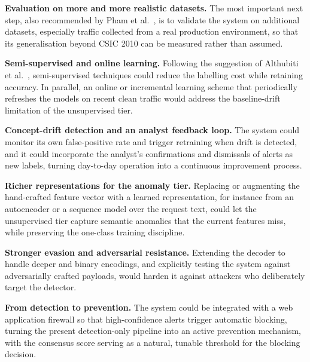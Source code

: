 \documentclass[12pt,a4paper]{report}
\begin{document}
\begin{romanlist}
  \item \textbf{Evaluation on more and more realistic datasets.} The most
        important next step, also recommended by Pham et al.~\cite{pham2016},
        is to validate the system on additional datasets, especially traffic
        collected from a real production environment, so that its
        generalisation beyond CSIC 2010 can be measured rather than assumed.

  \item \textbf{Semi-supervised and online learning.} Following the
        suggestion of Althubiti et al.~\cite{althubiti2017}, semi-supervised
        techniques could reduce the labelling cost while retaining accuracy.
        In parallel, an online or incremental learning scheme that
        periodically refreshes the models on recent clean traffic would
        address the baseline-drift limitation of the unsupervised tier.

  \item \textbf{Concept-drift detection and an analyst feedback loop.} The
        system could monitor its own false-positive rate and trigger
        retraining when drift is detected, and it could incorporate the
        analyst's confirmations and dismissals of alerts as new labels,
        turning day-to-day operation into a continuous improvement process.

  \item \textbf{Richer representations for the anomaly tier.} Replacing or
        augmenting the hand-crafted feature vector with a learned
        representation, for instance from an autoencoder or a sequence model
        over the request text, could let the unsupervised tier capture
        semantic anomalies that the current features miss, while preserving
        the one-class training discipline.

  \item \textbf{Stronger evasion and adversarial resistance.} Extending the
        decoder to handle deeper and binary encodings, and explicitly testing
        the system against adversarially crafted payloads, would harden it
        against attackers who deliberately target the detector.

  \item \textbf{From detection to prevention.} The system could be
        integrated with a web application firewall so that high-confidence
        alerts trigger automatic blocking, turning the present detection-only
        pipeline into an active prevention mechanism, with the consensus
        score serving as a natural, tunable threshold for the blocking
        decision.


\end{romanlist}
\end{document}
